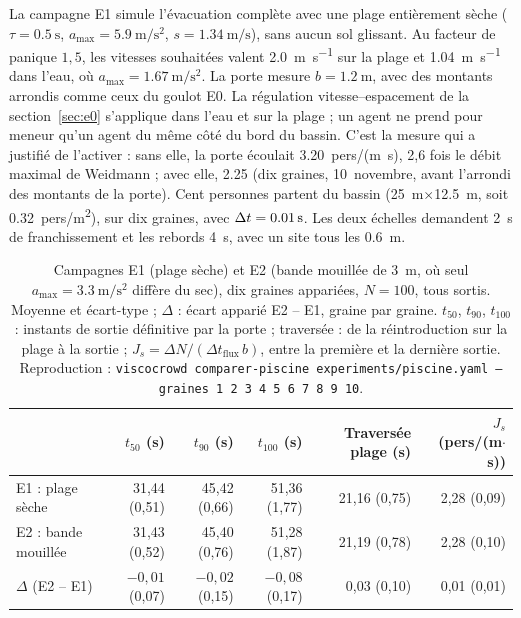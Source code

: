 La campagne E1 simule l'évacuation complète avec une plage entièrement sèche
($\tau=\SI{0.5}{\second}$, $a_{\max}=\SI{5.9}{\metre\per\second\squared}$,
$s=\SI{1.34}{\metre\per\second}$), sans aucun sol glissant. Au facteur de panique
$1{,}5$, les vitesses souhaitées valent \SI{2.0}{\metre\per\second} sur la plage et
\SI{1.04}{\metre\per\second} dans l'eau, où $a_{\max}=\SI{1.67}{\metre\per\second\squared}$.
La porte mesure $b=\SI{1.2}{\metre}$, avec des montants arrondis comme ceux du goulot E0.
La régulation vitesse--espacement de la section~\ref{sec:e0} s'applique dans l'eau et sur la
plage ; un agent ne prend pour meneur qu'un agent du même côté du bord du bassin. C'est la
mesure qui a justifié de l'activer : sans elle, la porte écoulait
\num{3.20}~pers/(\si{\metre\second}), 2,6 fois le débit maximal de Weidmann ; avec
elle, \num{2.25} (dix graines, 10~novembre, avant l'arrondi des montants de la porte). Cent
personnes partent du bassin (\SI{25}{\metre}$\times$\SI{12.5}{\metre}, soit
\num{0.32}~pers/\si{\metre\squared}), sur dix graines, avec $\Delta t=\SI{0.01}{\second}$. Les deux
échelles demandent \SI{2}{\second} de franchissement et les rebords \SI{4}{\second}, avec un
site tous les \SI{0.6}{\metre}.

\begin{table}[ht]
\centering
\caption{Campagnes E1 (plage sèche) et E2 (bande mouillée de \SI{3}{\metre}, où seul
$a_{\max}=\SI{3.3}{\metre\per\second\squared}$ diffère du sec), dix graines appariées,
$N=100$, tous sortis. Moyenne et écart-type ; $\Delta$ : écart apparié E2 -- E1, graine par
graine. $t_{50}$, $t_{90}$, $t_{100}$ : instants de sortie définitive par la porte ;
traversée : de la réintroduction sur la plage à la sortie ;
$J_s=\Delta N/(\Delta t_{\text{flux}}\,b)$, entre la première et la dernière sortie.
Reproduction : \texttt{viscocrowd comparer-piscine experiments/piscine.yaml --graines 1 2 3
4 5 6 7 8 9 10}.}
\label{tab:e1}
\label{tab:e2}
\begin{tabular}{lrrrrr}
\toprule
 & $t_{50}$ (s) & $t_{90}$ (s) & $t_{100}$ (s) & Traversée plage (s) & $J_s$ (pers/(m$\cdot$s)) \\
\midrule
E1 : plage sèche & 31,44 (0,51) & 45,42 (0,66) & 51,36 (1,77) & 21,16 (0,75) & 2,28 (0,09) \\
E2 : bande mouillée & 31,43 (0,52) & 45,40 (0,76) & 51,28 (1,87) & 21,19 (0,78) & 2,28 (0,10) \\
\midrule
$\Delta$ (E2 -- E1) & $-0{,}01$ (0,07) & $-0{,}02$ (0,15) & $-0{,}08$ (0,17) & 0,03 (0,10) & 0,01 (0,01) \\
\bottomrule
\end{tabular}
\end{table}

